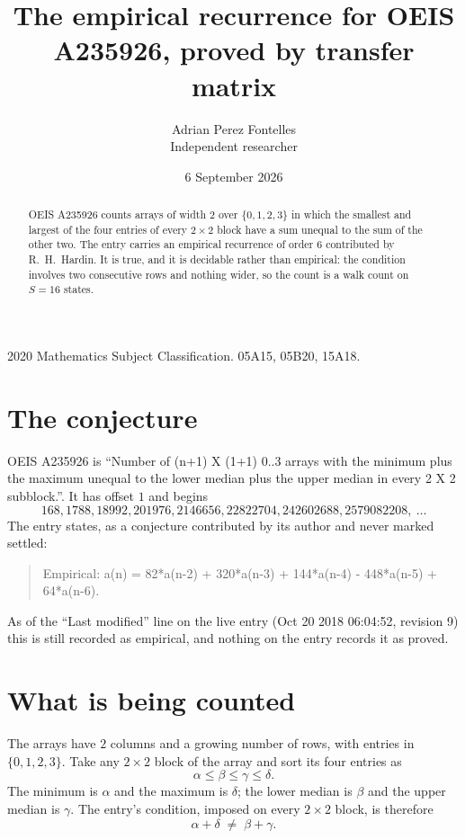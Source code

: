 \documentclass[11pt,a4paper]{article}
\title{The empirical recurrence for OEIS A235926, proved by transfer matrix}
\author{Adrian Perez Fontelles\\ \small Independent researcher}
\date{6 September 2026}
\theoremstyle{plain}
\theoremstyle{definition}
\begin{document}
\maketitle

\begin{abstract}
OEIS A235926 counts arrays of width $2$ over $\{0,1,2,3\}$ in which the smallest and largest of the
four entries of every $2\times2$ block have a sum unequal to the sum of the other two. The entry
carries an empirical recurrence of order $6$ contributed by R.~H.~Hardin. It is true, and
it is decidable rather than empirical: the condition involves two consecutive rows and nothing
wider, so the count is a walk count on $S=16$ states.
\end{abstract}

\noindent\small 2020 Mathematics Subject Classification. 05A15, 05B20, 15A18.\normalsize

\section{The conjecture}

OEIS A235926 is ``Number of (n+1) X (1+1) 0..3 arrays with the minimum plus the maximum unequal to the lower median plus the upper median in every 2 X 2 subblock.''. It has offset $1$ and begins
\[
168, 1788, 18992, 201976, 2146656, 22822704, 242602688, 2579082208,\ \dots
\]
The entry states, as a conjecture contributed by its author and never marked settled:
\begin{quote}
Empirical: a(n) = 82*a(n-2) + 320*a(n-3) + 144*a(n-4) - 448*a(n-5) + 64*a(n-6).
\end{quote}
As of the ``Last modified'' line on the live entry (Oct 20 2018 06:04:52, revision 9) this is still
recorded as empirical, and nothing on the entry records it as proved.

\section{What is being counted}

The arrays have $2$ columns and a growing number of rows, with entries in $\{0,1,2,3\}$. Take any
$2\times2$ block of the array and sort its four entries as
\[
\alpha\le\beta\le\gamma\le\delta .
\]
The minimum is $\alpha$ and the maximum is $\delta$; the lower median is $\beta$ and the upper
median is $\gamma$. The entry's condition, imposed on every $2\times2$ block, is therefore
\[
\alpha+\delta\;\neq\;\beta+\gamma .
\]
\end{document}
